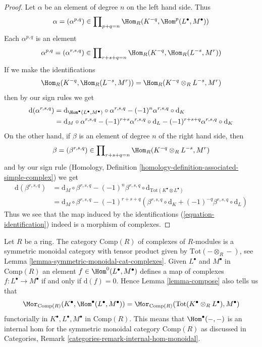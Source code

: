 \begin{proof}
Let $\alpha$ be an element of degree $n$ on the left hand side.
Thus
$$
\alpha = (\alpha^{p, q}) \in
\prod\nolimits_{p + q = n} \Hom_R(K^{-q}, \Hom^p(L^\bullet, M^\bullet))
$$
Each $\alpha^{p, q}$ is an element
$$
\alpha^{p, q} = (\alpha^{r, s, q}) \in
\prod\nolimits_{r + s + q = n} \Hom_R(K^{-q}, \Hom_R(L^{-s}, M^r))
$$
If we make the identifications
\begin{equation}
\label{equation-identification}
\Hom_R(K^{-q}, \Hom_R(L^{-s}, M^r)) = \Hom_R(K^{-q} \otimes_R L^{-s}, M^r)
\end{equation}
then by our sign rules we get
\begin{align*}
\text{d}(\alpha^{r, s, q})
& =
\text{d}_{\Hom^\bullet(L^\bullet, M^\bullet)} \circ \alpha^{r, s, q}
- (-1)^n \alpha^{r, s, q} \circ \text{d}_K \\
& =
\text{d}_M \circ \alpha^{r, s, q}
- (-1)^{r + s} \alpha^{r, s, q} \circ \text{d}_L
- (-1)^{r + s + q} \alpha^{r, s, q} \circ \text{d}_K
\end{align*}
On the other hand, if $\beta$ is an element of degree $n$ of
the right hand side, then
$$
\beta = (\beta^{r, s, q}) \in \prod\nolimits_{r + s + q = n}
\Hom_R(K^{-q} \otimes_R L^{-s}, M^r)
$$
and by our sign rule (Homology, Definition
\ref{homology-definition-associated-simple-complex}) we get
\begin{align*}
\text{d}(\beta^{r, s, q})
& =
\text{d}_M \circ \beta^{r, s, q}
- (-1)^n \beta^{r, s, q} \circ
\text{d}_{\text{Tot}(K^\bullet \otimes L^\bullet)} \\
& =
\text{d}_M \circ \beta^{r, s, q}
- (-1)^{r + s + q} \left(
\beta^{r, s, q} \circ \text{d}_K + (-1)^{-q} \beta^{r, s, q} \circ \text{d}_L
\right)
\end{align*}
Thus we see that the map induced by the identifications
(\ref{equation-identification}) indeed is a morphism of complexes.
\end{proof}

\begin{remark}
\label{remark-internal-hom}
Let $R$ be a ring. The category $\text{Comp}(R)$
of complexes of $R$-modules is a symmetric monoidal category
with tensor product given by $\text{Tot}(- \otimes_R -)$, see
Lemma \ref{lemma-symmetric-monoidal-cat-complexes}.
Given $L^\bullet$ and $M^\bullet$ in $\text{Comp}(R)$
an element $f \in \Hom^0(L^\bullet, M^\bullet)$ defines a
map of complexes $f : L^\bullet \to M^\bullet$ if and only if
$\text{d}(f) = 0$. Hence Lemma \ref{lemma-compose} also tells us that
$$
\Mor_{\text{Comp}(R)}(K^\bullet, \Hom^\bullet(L^\bullet, M^\bullet))
=
\Mor_{\text{Comp}(R)}(\text{Tot}(K^\bullet \otimes_R L^\bullet), M^\bullet)
$$
functorially in $K^\bullet, L^\bullet, M^\bullet$ in $\text{Comp}(R)$.
This means that $\Hom^\bullet( - , -)$ is an internal hom
for the symmetric monoidal category $\text{Comp}(R)$ as discussed in
Categories, Remark \ref{categories-remark-internal-hom-monoidal}.
\end{remark}

